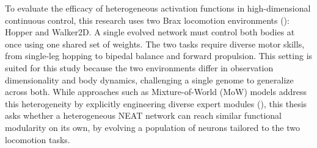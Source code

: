\documentclass[12pt]{article}
\begin{document}
To evaluate the efficacy of heterogeneous activation functions in high-dimensional continuous control, this research uses two Brax locomotion environments (\cite{freeman_brax_2021}): Hopper and Walker2D.
A single evolved network must control both bodies at once using one shared set of weights.
The two tasks require diverse motor skills, from single-leg hopping to bipedal balance and forward propulsion.
This setting is suited for this study because the two environments differ in observation dimensionality and body dynamics, challenging a single genome to generalize across both.
While approaches such as Mixture-of-World (MoW) models address this heterogeneity by explicitly engineering diverse expert modules (\cite{zhang_mixtureofworld_2026}), this thesis asks whether a heterogeneous NEAT network can reach similar functional modularity on its own, by evolving a population of neurons tailored to the two locomotion tasks.



\end{document}
